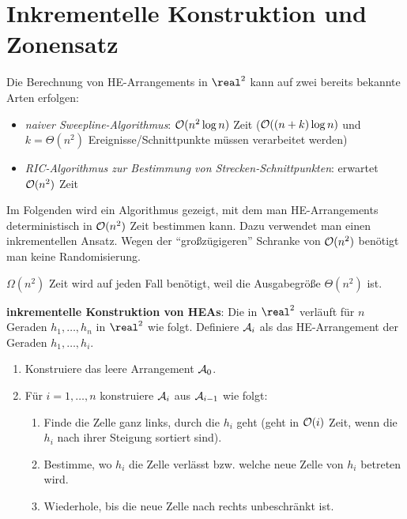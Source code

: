 \pagebreak

\section{%
    Inkrementelle Konstruktion und Zonensatz%
}

Die Berechnung von HE-Arrangements in $\real^2$ kann auf zwei bereits bekannte Arten erfolgen:
\begin{itemize}
    \item
    \emph{naiver Sweepline-Algorithmus}:
    $\mathcal{O}(n^2 \log n)$ Zeit ($\mathcal{O}((n+k) \log n)$ und $k = \Theta(n^2)$ Ereignisse/Schnittpunkte
    müssen verarbeitet werden)

    \item
    \emph{RIC-Algorithmus zur Bestimmung von Strecken-Schnittpunkten}:
    erwartet $\mathcal{O}(n^2)$ Zeit
\end{itemize}
Im Folgenden wird ein Algorithmus gezeigt, mit dem man HE-Arrangements deterministisch in
$\mathcal{O}(n^2)$ Zeit bestimmen kann.
Dazu verwendet man einen inkrementellen Ansatz.
Wegen der "`großzügigeren"' Schranke von $\mathcal{O}(n^2)$ benötigt man keine Randomisierung.

$\Omega(n^2)$ Zeit wird auf jeden Fall benötigt, weil die Ausgabegröße $\Theta(n^2)$ ist.

\linie

\textbf{inkrementelle Konstruktion von HEAs}:
Die  in $\real^2$ verläuft für $n$ Geraden
$h_1, \dotsc, h_n$ in $\real^2$ wie folgt.
Definiere $\mathcal{A}_i$ als das HE-Arrangement der Geraden $h_1, \dotsc, h_i$.
\begin{enumerate}
    \item
    Konstruiere das leere Arrangement $\mathcal{A}_0$.

    \item
    Für $i = 1, \dotsc, n$ konstruiere $\mathcal{A}_i$ aus $\mathcal{A}_{i-1}$ wie folgt:
    \begin{enumerate}
        \item
        Finde die Zelle ganz links, durch die $h_i$ geht
        (geht in $\mathcal{O}(i)$ Zeit, wenn die $h_i$ nach ihrer Steigung sortiert sind).

        \item
        Bestimme, wo $h_i$ die Zelle verlässt bzw. welche neue Zelle von $h_i$ betreten wird.

        \item
        Wiederhole, bis die neue Zelle nach rechts unbeschränkt ist.
    \end{enumerate}
\end{enumerate}

